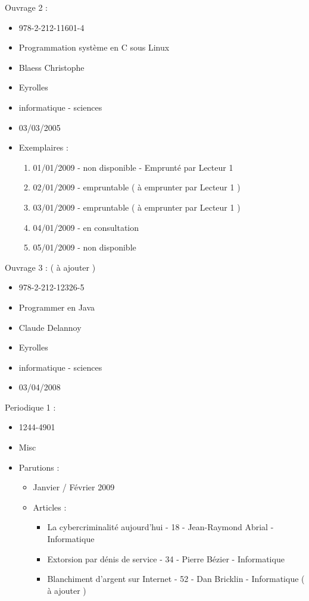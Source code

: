 \documentclass[a4paper,10pt]{report}
\begin{document}
\begin{flushleft}
\begin{itemize}
\end{itemize}
\bigskip
Ouvrage 2 :
\begin{itemize}
 \item 978-2-212-11601-4
 \item Programmation système en C sous Linux
 \item Blaess Christophe
 \item Eyrolles
 \item informatique - sciences
 \item 03/03/2005
 \item Exemplaires :
	\begin{enumerate}
		\item 01/01/2009 - non disponible - Emprunté par Lecteur 1
		\item 02/01/2009 - empruntable ( à emprunter par Lecteur 1 )
		\item 03/01/2009 - empruntable ( à emprunter par Lecteur 1 )
		\item 04/01/2009 - en consultation
		\item 05/01/2009 - non disponible
	\end{enumerate}
\end{itemize}
\bigskip
Ouvrage 3 : ( à ajouter )
\begin{itemize}
 \item 978-2-212-12326-5
 \item Programmer en Java
 \item Claude Delannoy
 \item Eyrolles
 \item informatique - sciences
 \item 03/04/2008
\end{itemize}
\bigskip
\bigskip
\newpage
Periodique 1 :
\begin{itemize}
 \item 1244-4901
 \item Misc
 \item Parutions :
	\begin{itemize}
		\item Janvier / Février 2009
		\item Articles :
		\begin{itemize}
			\item La cybercriminalité aujourd’hui - 18 - Jean-Raymond Abrial -Informatique
			\item Extorsion par dénis de service - 34 - Pierre Bézier - Informatique
			\item Blanchiment d’argent sur Internet - 52 - Dan Bricklin - Informatique ( à ajouter )

\end{itemize}
\end{itemize}
\end{itemize}
\end{flushleft}
\end{document}
